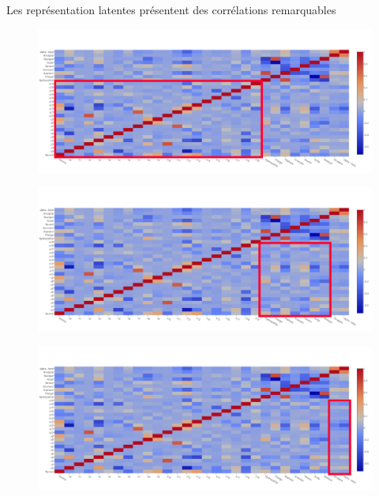 \documentclass{beamer}
\begin{document}
\begin{frame}{Les représentation latentes présentent des corrélations remarquables}

  {
    \begin{figure}
      \centering
      \includegraphics[scale=0.27]{../Figures/SingleOneRecHeatf1}
    \end{figure}
  }
  {
    \begin{figure}
      \centering
      \includegraphics[scale=0.27]{../Figures/SingleOneRecHeatf2}
    \end{figure}
  }
  {
    \begin{figure}
      \centering
      \includegraphics[scale=0.27]{../Figures/SingleOneRecHeatf3}
    \end{figure}
  }


\end{frame}
\end{document}
